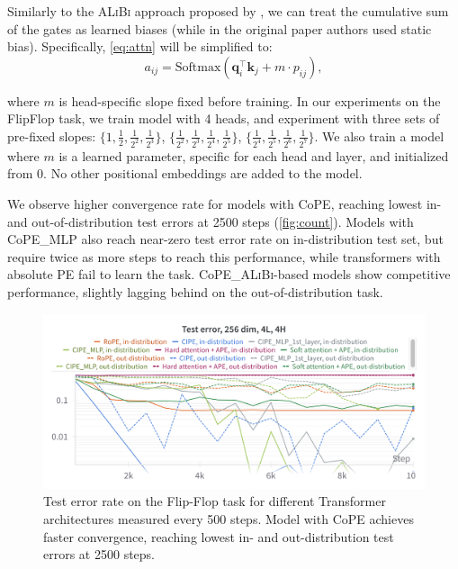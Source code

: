 \documentclass{article}
\newcommand{\ours}{CoPE\xspace}
\renewcommand{\vec}{\mathbf}
\begin{document}
Similarly to the \textsc{ALiBi} approach proposed by \cite{press2021train}, we can treat the cumulative sum of the gates as learned biases (while in the original paper authors used static bias). Specifically,  \cref{eq:attn} will be simplified to:
\begin{equation}
\label{eq:alibi_attn}
a_{ij} = \text{Softmax}(\vec{q}_i^\top \vec{k}_j + m \cdot p_{ij}) ,
\end{equation}

where $m$ is head-specific slope fixed before training. In our experiments on the FlipFlop task, we train model with 4 heads, and experiment with three sets of pre-fixed slopes: $\{1, \frac{1}{2}, \frac{1}{2^2}, \frac{1}{2^3}\}$, $\{\frac{1}{2^2}, \frac{1}{2^3}, \frac{1}{2^4}, \frac{1}{2^5}\}$, $\{\frac{1}{2^4}, \frac{1}{2^5}, \frac{1}{2^6}, \frac{1}{2^7}\}$. We also train a model where $m$ is a learned parameter, specific for each head and layer, and initialized from $0$. No other positional embeddings are added to the model.

We observe higher convergence rate for models with \ours, reaching lowest in- and out-of-distribution test errors at 2500 steps (\cref{fig:count}). Models with \ours\_MLP also reach near-zero test error rate on in-distribution test set, but require twice as more steps to reach this performance, while transformers with absolute PE fail to learn the task. \ours\_\textsc{ALiBi}-based models show competitive performance, slightly lagging behind on the out-of-distribution task.

\begin{figure}[h]
  \centering
  \includegraphics[width=14cm]{figs/flipflop.png}
  \caption{Test error rate on the Flip-Flop task for different Transformer architectures measured every 500 steps. Model with \ours achieves faster convergence, reaching lowest in- and out-distribution test errors at 2500 steps.}
  \label{fig:flipflop_app}
\end{figure}
\end{document}
